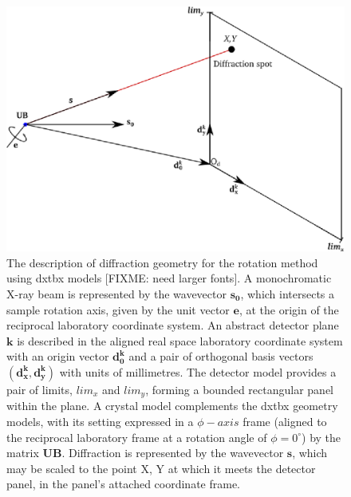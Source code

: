 \documentclass[preprint]{iucr}
\begin{document}
\onecolumn
\begin{figure}
\label{figure: geometry}
\centering
\caption{The description of diffraction geometry for the rotation method using 
dxtbx models [FIXME: need larger fonts]. A monochromatic X-ray beam is 
represented by the wavevector \(\bm{s_0}\), which intersects a sample rotation 
axis, given by the unit vector \(\bm{e}\), at the origin of the reciprocal 
laboratory coordinate system. An abstract detector plane \(\bm{k}\) is described 
in the aligned real space laboratory coordinate system with an origin vector 
\(\bm{d^k_0}\) and a pair of orthogonal basis vectors 
\((\bm{d^k_x}, \bm{d^k_y})\) with units of millimetres. The detector model 
provides a pair of limits, \(lim_x\) and \(lim_y\), forming a bounded rectangular 
panel within the plane. A crystal model complements the dxtbx geometry models, 
with its setting expressed in a \(\phi-axis\) frame (aligned to the reciprocal 
laboratory frame at a rotation angle of \(\phi = 0^{\circ}\)) by the matrix 
\(\bm{UB}\). Diffraction is represented by the wavevector \(\bm{s}\), which may 
be scaled to the point X, Y at which it meets the detector panel, in the panel's 
attached coordinate frame.}
\includegraphics[width=\textwidth]{./Figures/fig2.eps}
\end{figure}
\twocolumn
\end{document}
